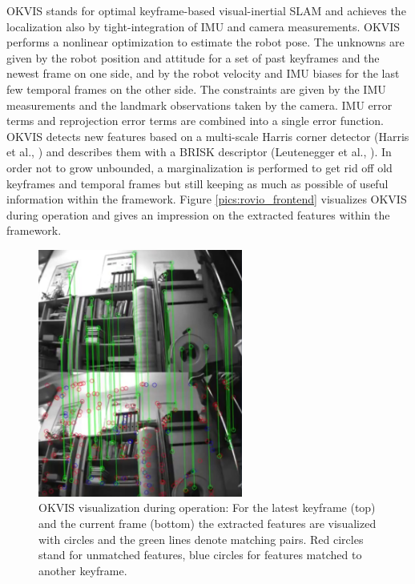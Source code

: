 OKVIS stands for optimal keyframe-based visual-inertial SLAM and achieves the localization also by tight-integration of IMU and camera measurements. OKVIS performs a nonlinear optimization to estimate the robot pose. The unknowns are given by the robot position and attitude for a set of past keyframes and the newest frame on one side, and by the robot velocity and IMU biases for the last few temporal frames on the other side. The constraints are given by the IMU measurements and the landmark observations taken by the camera. IMU error terms and reprojection error terms are combined into a single error function. OKVIS detects new features based on a multi-scale Harris corner detector (Harris et al., \cite{harris1988combined}) and describes them with a BRISK descriptor (Leutenegger et al., \cite{leutenegger2011brisk}). In order not to grow unbounded, a marginalization is performed to get rid off old keyframes and temporal frames but still keeping as much as possible of useful information within the framework. Figure \ref{pics:rovio_frontend} visualizes OKVIS during operation and gives an impression on the extracted features within the framework.

\begin{figure}[h]
   \centering
   \includegraphics[width=0.6\textwidth]{images/okvis_frontend.png}
   \caption{OKVIS visualization during operation: For the latest keyframe (top) and the current frame (bottom) the extracted features are visualized with circles and the green lines denote matching pairs. Red circles stand for unmatched features, blue circles for features matched to another keyframe.}
   \label{pics:okvis_frontend}
\end{figure}


